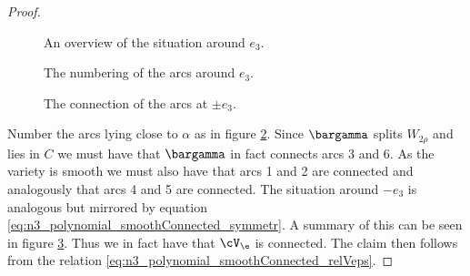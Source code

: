 \begin{proof}
\begin{figure}
    \caption{An overview of the situation around $e_3$.}
    \label{fi:n3_polynomial_arcOverview}
  \end{figure}
  \begin{figure}
    \centering
    
    \caption{The numbering of the arcs around $e_3$.}
    \label{fi:n3_polynomial_arcNumbering}
  \end{figure}
  \begin{figure}
    \centering
    
    \caption{The connection of the arcs at $\pm e_3$.}
    \label{fi:n3_polynomial_arcConnections}
  \end{figure}
  Number the arcs lying close to $\alpha$ as in figure \ref{fi:n3_polynomial_arcNumbering}.
  Since $\bargamma$ splits $W_{2\rho}$ and lies in $C$ we must have that
  $\bargamma$ in fact connects arcs 3 and 6.
  As the variety is smooth we must also have that arcs 1 and 2 are connected
  and analogously that arcs 4 and 5 are connected.
  The situation around $-e_3$ is analogous but mirrored by equation \eqref{eq:n3_polynomial_smoothConnected_symmetr}.
  A summary of this can be seen in figure \ref{fi:n3_polynomial_arcConnections}.
  Thus we in fact have that $\cV_\e$ is connected. 
  The claim then follows from the relation \eqref{eq:n3_polynomial_smoothConnected_relVeps}.



\end{proof}
